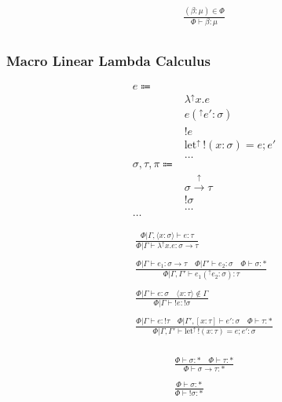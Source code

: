 \documentclass {article}
\begin{document}
\begin{gather*}
\frac
{(\beta : \mu) \in \Phi}
{\Phi \vdash \beta : \mu } \\
\end{gather*}

\subsubsection{Macro Linear Lambda Calculus}
\begin{align*}
e \Coloneqq & \\
& \lambda^\uparrow x. e \tag{Macro Lambda}\\
& e(^\uparrow e' : \sigma) \tag{Macro Application}\\
& !e \tag{Bang Introduction} \\
& \text{let}^\uparrow \, !(x : \sigma) = e; e' \tag{Bang Elimination} \\
& \dots \\
\sigma, \tau, \pi \Coloneqq & \\
& \sigma \xrightarrow{\uparrow} \tau \tag{Macro} \\
& !\sigma \tag{Bang} \\
& \dots \\
\dots
\end{align*}

\begin{gather*}
\frac
{\Phi | \Gamma, \langle x : \sigma \rangle \vdash e : \tau}
{\Phi | \Gamma \vdash \lambda^\uparrow x. e : \sigma \to \tau } \\
\\
\frac
{\Phi | \Gamma \vdash e_1 : \sigma \to \tau \quad \Phi | \Gamma' \vdash e_2 : \sigma \quad \Phi \vdash \sigma : *}
{\Phi | \Gamma, \Gamma' \vdash e_1(^\uparrow e_2 : \sigma) : \tau} \\
\\
\frac
{\Phi | \Gamma \vdash e : \sigma \quad \langle x : \tau \rangle \notin \Gamma }
{\Phi | \Gamma \vdash !e : !\sigma } \\
\\
\frac
{\Phi | \Gamma \vdash e : !\tau \quad \Phi | \Gamma', [x : \tau] \vdash e' : \sigma \quad \Phi \vdash \tau : * }
{\Phi | \Gamma, \Gamma' \vdash \text{let}^\uparrow \, !(x : \tau) = e; e' : \sigma}  \\
\end{gather*}

\begin{gather*}
\frac
{\Phi \vdash \sigma : * \quad \Phi \vdash \tau : *}
{\Phi \vdash \sigma \to \tau : * } \\
\\
\frac
{\Phi \vdash \sigma : * }
{\Phi \vdash !\sigma : * } \\
\end{gather*}
\end{document}
